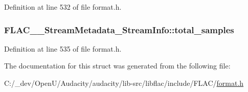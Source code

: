Definition at line 532 of file format.\+h.

\subsubsection[{\texorpdfstring{total\+\_\+samples}{total_samples}}]{ F\+L\+A\+C\+\_\+\+\_\+\+Stream\+Metadata\+\_\+\+Stream\+Info\+::total\+\_\+samples}\hypertarget{struct_f_l_a_c_____stream_metadata___stream_info_a23d6f6769cb9bbf052a3a4f592f2e383}{}\label{struct_f_l_a_c_____stream_metadata___stream_info_a23d6f6769cb9bbf052a3a4f592f2e383}


Definition at line 535 of file format.\+h.



The documentation for this struct was generated from the following file\+:\begin{DoxyCompactItemize}
\item 
C\+:/\+\_\+dev/\+Open\+U/\+Audacity/audacity/lib-\/src/libflac/include/\+F\+L\+A\+C/\hyperlink{include_2_f_l_a_c_2format_8h}{format.\+h}\end{DoxyCompactItemize}
